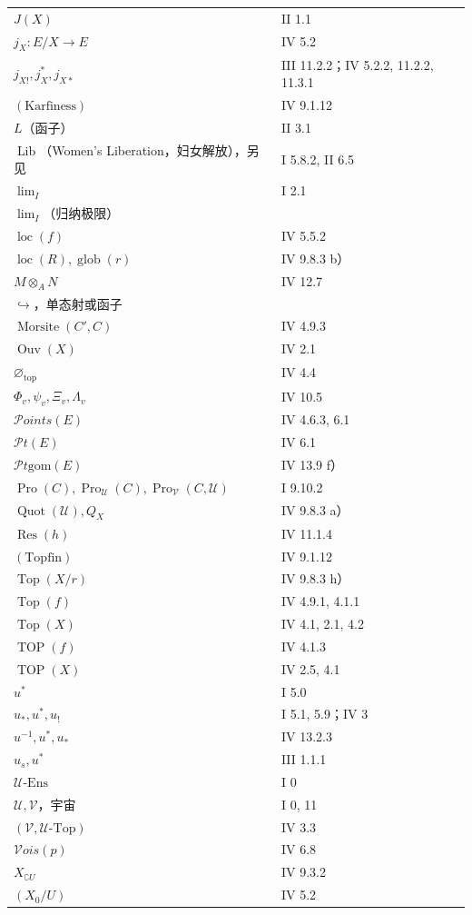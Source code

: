 \begin{longtable}{@{}p{}p{}@{}}
$J(X)$ & II 1.1\\
$j_X:E/X\to E$ & IV 5.2\\
$j_{X!},j_X^*,j_{X*}$ & III 11.2.2；IV 5.2.2, 11.2.2, 11.3.1\\
$\mathrm{(Karfiness)}$ & IV 9.1.12\\
$L$（函子） & II 3.1\\
$\operatorname{Lib}$（Women’s Liberation，妇女解放），另见 & I 5.8.2, II 6.5\\
$\displaystyle\lim_I$ & I 2.1\\
$\displaystyle\lim_I$（归纳极限） & \\
$\operatorname{loc}(f)$ & IV 5.5.2\\
$\operatorname{loc}(R),\operatorname{glob}(r)$ & IV 9.8.3 b）\\
$M\otimes_A N$ & IV 12.7\\
$\hookrightarrow$，单态射或函子 & \\
$\operatorname{Morsite}(C',C)$ & IV 4.9.3\\
$\operatorname{Ouv}(X)$ & IV 2.1\\
$\varnothing_{\mathrm{top}}$ & IV 4.4\\
$\Phi_v,\psi_v,\Xi_v,\Lambda_v$ & IV 10.5\\
$\mathscr{P}\!oints(E)$ & IV 4.6.3, 6.1\\
$\mathscr{P}\!t(E)$ & IV 6.1\\
$\mathscr{P}\!t\mathrm{gom}(E)$ & IV 13.9 f）\\
$\operatorname{Pro}(C),\operatorname{Pro}_{\mathcal U}(C),\operatorname{Pro}_{\mathcal V}(C,\mathcal U)$ & I 9.10.2\\
$\operatorname{Quot}(\mathcal U),Q_X$ & IV 9.8.3 a）\\
$\operatorname{Res}(h)$ & IV 11.1.4\\
$\mathrm{(Topfin)}$ & IV 9.1.12\\
$\operatorname{Top}(X/r)$ & IV 9.8.3 h）\\
$\operatorname{Top}(f)$ & IV 4.9.1, 4.1.1\\
$\operatorname{Top}(X)$ & IV 4.1, 2.1, 4.2\\
$\operatorname{TOP}(f)$ & IV 4.1.3\\
$\operatorname{TOP}(X)$ & IV 2.5, 4.1\\
$u^*$ & I 5.0\\
$u_*,u^*,u_!$ & I 5.1, 5.9；IV 3\\
$u^{-1},u^*,u_*$ & IV 13.2.3\\
$u_s,u^*$ & III 1.1.1\\
$\mathcal U\text{-}\mathrm{Ens}$ & I $0$\\
$\mathcal U,\mathcal V$，宇宙 & I $0$, 11\\
$(\mathcal V,\mathcal U\text{-}\mathrm{Top})$ & IV 3.3\\
$\mathscr{V}\!ois(p)$ & IV 6.8\\
$X_{\complement U}$ & IV 9.3.2\\
$(X_0/U)$ & IV 5.2\\
\end{longtable}
